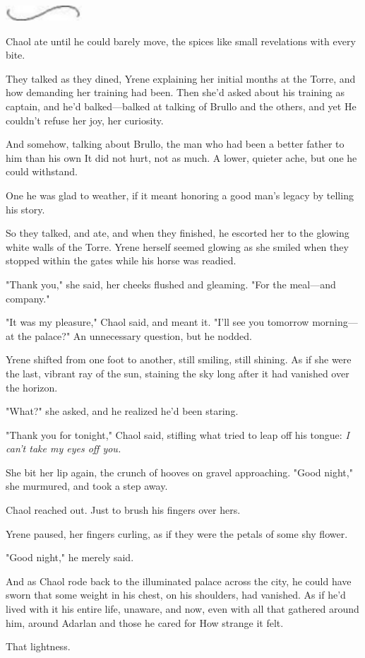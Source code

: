\includegraphics[width=1.12in,height=0.24in]{images/seperator}

Chaol ate until he could barely move, the spices like small revelations with every bite.

They talked as they dined, Yrene explaining her initial months at the Torre, and how demanding her training had been. Then she'd asked about his training as captain, and he'd balked---balked at talking of Brullo and the others, and yet  He couldn't refuse her joy, her curiosity.

And somehow, talking about Brullo, the man who had been a better father to him than his own  It did not hurt, not as much. A lower, quieter ache, but one he could withstand.

One he was glad to weather, if it meant honoring a good man's legacy by telling his story.

So they talked, and ate, and when they finished, he escorted her to the glowing white walls of the Torre. Yrene herself seemed glowing as she smiled when they stopped within the gates while his horse was readied.

"Thank you," she said, her cheeks flushed and gleaming. "For the meal---and company."

"It was my pleasure," Chaol said, and meant it. "I'll see you tomorrow morning---at the palace?" An unnecessary question, but he nodded.

Yrene shifted from one foot to another, still smiling, still shining. As if she were the last, vibrant ray of the sun, staining the sky long after it had vanished over the horizon.

"What?" she asked, and he realized he'd been staring.

"Thank you for tonight," Chaol said, stifling what tried to leap off his tongue: \emph{I can't take my eyes off you.}

She bit her lip again, the crunch of hooves on gravel approaching. "Good night," she murmured, and took a step away.

Chaol reached out. Just to brush his fingers over hers.

Yrene paused, her fingers curling, as if they were the petals of some shy flower.

"Good night," he merely said.

And as Chaol rode back to the illuminated palace across the city, he could have sworn that some weight in his chest, on his shoulders, had vanished. As if he'd lived with it his entire life, unaware, and now, even with all that gathered around him, around Adarlan and those he cared for  How strange it felt.

That lightness.

